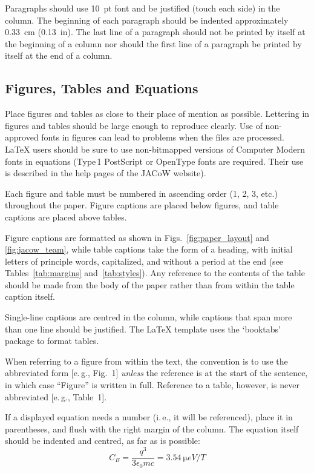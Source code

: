 \documentclass[a4paper,
               keeplastbox,   %
               ]{jacow}
\begin{document}
Paragraphs should use \SI{10}{pt} font and be justified (touch each side) in
the column. The beginning of each paragraph should be indented
approximately \SI{0.33}{cm} (\SI{0.13}{in}). The last line of a paragraph should not be
printed by itself at the beginning of a column nor should the first line of
a paragraph be printed by itself at the end of a column.

\subsection{Figures, Tables and Equations}

Place figures and tables as close to their place of mention as
possible. Lettering in figures and tables should be large enough to
reproduce clearly. Use of non-approved fonts in figures can lead to
problems when the files are processed. \LaTeX{} users should be sure to use
non-bitmapped versions of Computer Modern fonts in equations (Type\,1 PostScript
or OpenType fonts are required. Their use is described in the help 
pages of the JACoW website\cite{jacow-help}).

Each figure and table must be numbered in ascending
order (1, 2, 3, etc.) throughout the paper. 
Figure captions are placed below figures, and table
captions are placed above tables.

Figure captions are formatted as shown in Figs.~\ref{fig:paper_layout} and \ref{fig:jacow_team},
while table captions take the form of a heading,
with initial letters of principle words, capitalized, and
without a period at the end (see Tables~\ref{tab:margins} and~\ref{tab:styles}).
Any reference to the contents of the table should be made from
the body of the paper rather than from within the table
caption itself.

Single-line captions are centred in the column, while captions
that span more than one line should be justified.
The \LaTeX{} template uses the ‘booktabs’ package to
format tables. 

When referring to a figure from within the text, the
convention is to use the abbreviated form [e.\,g., Fig.~1]
\emph{unless} the reference is at the start of the sentence, in
which case “Figure” is written in full. Reference to a
table, however, is never abbreviated [e.\,g., Table~1].


If a displayed equation needs a number (i.\,e., it will be
referenced), place it in parentheses, and flush with the
right margin of the column. The equation itself should be
indented and centred, as far as is possible:
\begin{equation}\label{eq:label}
    C_B=\frac{q^3}{3\epsilon_{0} mc}=\SI{3.54}{\micro eV/T}
\end{equation}
\end{document}
